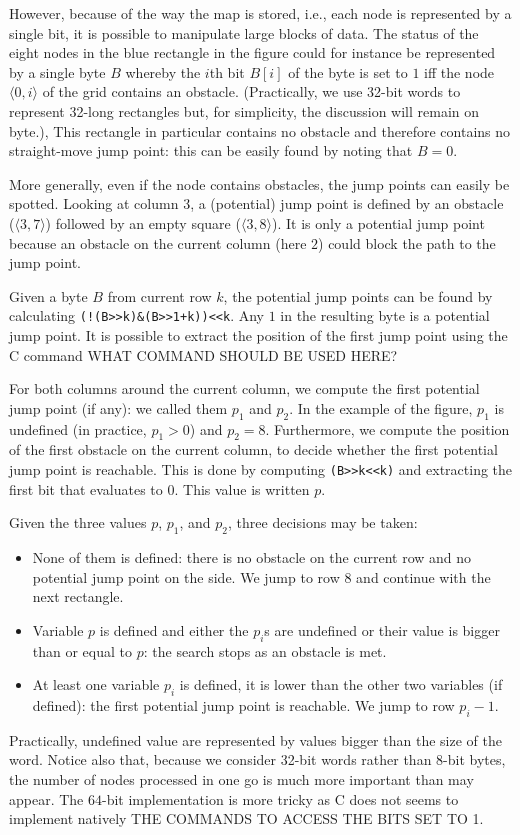 However, because of the way the map is stored, 
i.e., each node is represented by a single bit, 
it is possible to manipulate large blocks of data.  
The status of the eight nodes in the blue rectangle in the figure 
could for instance be represented by a single byte $B$ 
whereby the $i$th bit $B[i]$ of the byte is set to $1$ 
iff the node $\langle 0,i\rangle$ of the grid contains an obstacle.  
(Practically, we use 32-bit words 
to represent 32-long rectangles 
but, for simplicity, the discussion will remain on byte.), 
This rectangle in particular contains no obstacle 
and therefore contains no straight-move jump point: 
this can be easily found by noting that $B = 0$.  

More generally, even if the node contains obstacles, 
the jump points can easily be spotted.  
Looking at column $3$, a (potential) jump point 
is defined by an obstacle ($\langle 3, 7\rangle$) 
followed by an empty square ($\langle 3,8\rangle$).  
It is only a potential jump point 
because an obstacle on the current column (here $2$) 
could block the path to the jump point.  

Given a byte $B$ from current row $k$, the potential jump points 
can be found by calculating \texttt{(!(B>>k)\&(B>>1+k))<<k}.  
Any $1$ in the resulting byte is a potential jump point.  
It is possible to extract the position of the first jump point 
using the C command WHAT COMMAND SHOULD BE USED HERE?

For both columns around the current column, 
we compute the first potential jump point (if any): 
we called them $p_1$ and $p_2$.  
In the example of the figure, $p_1$ is undefined 
(in practice, $p_1 > 0$) and $p_2 = 8$.  
Furthermore, we compute the position 
of the first obstacle on the current column, 
to decide whether the first potential jump point is reachable.  
This is done by computing \texttt{(B>>k<<k)} 
and extracting the first bit that evaluates to $0$.  
This value is written $p$.  

Given the three values $p$, $p_1$, and $p_2$, 
three decisions may be taken: 
\begin{itemize}
\item 
  None of them is defined: 
  there is no obstacle on the current row 
  and no potential jump point on the side.  
  We jump to row $8$ and continue with the next rectangle. 
\item 
  Variable $p$ is defined and either the $p_i$s are undefined 
  or their value is bigger than or equal to $p$: 
  the search stops as an obstacle is met.  
\item 
  At least one variable $p_i$ is defined, 
  it is lower than the other two variables (if defined): 
  the first potential jump point is reachable.  
  We jump to row $p_i-1$.  
\end{itemize}
Practically, undefined value are represented by values 
bigger than the size of the word.  
Notice also that, because we consider 32-bit words 
rather than $8$-bit bytes, 
the number of nodes processed in one go 
is much more important than may appear.  
The $64$-bit implementation is more tricky 
as C does not seems to implement natively 
THE COMMANDS TO ACCESS THE BITS SET TO 1.  

